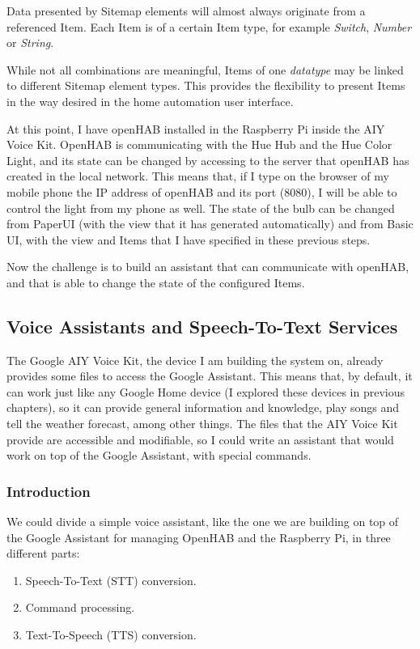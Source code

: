 Data presented by Sitemap elements will almost always originate from a referenced Item. Each Item is of a certain Item type, for 
example \textit{Switch}, \textit{Number} or \textit{String}.

While not all combinations are meaningful, Items of one \textit{datatype} may be linked to different Sitemap element types. This 
provides the flexibility to present Items in the way desired in the home automation user interface.

\bigskip
At this point, I have openHAB installed in the Raspberry Pi inside the AIY Voice Kit. OpenHAB is communicating with the Hue Hub and
the Hue Color Light, and its state can be changed by accessing to the server that openHAB has created in the local network. This means
that, if I type on the browser of my mobile phone the IP address of openHAB and its port (8080), I will be able to control the light from
my phone as well. The state of the bulb can be changed from PaperUI (with the view that it has generated automatically) and from 
Basic UI, with the view and Items that I have specified in these previous steps.

Now the challenge is to build an assistant that can communicate with openHAB, and that is able to change the state of the configured
Items.

\subsection{Voice Assistants and Speech-To-Text Services}
The Google AIY Voice Kit, the device I am building the system on, already provides some files to access the Google Assistant. This
means that, by default, it can work just like any Google Home device (I explored these devices in previous chapters), so it can
provide general information and knowledge, play songs and tell the weather forecast, among other things. The files that the AIY Voice
Kit provide are accessible and modifiable, so I could write an assistant that would work on top of the Google Assistant, with special
commands.

\subsubsection{Introduction}
We could divide a simple voice assistant, like the one we are building on top of the Google Assistant for managing OpenHAB and the 
Raspberry Pi, in three different parts:
\begin{enumerate}
	\item Speech-To-Text (STT) conversion.
	\item Command processing.
	\item Text-To-Speech (TTS) conversion.
\end{enumerate}

